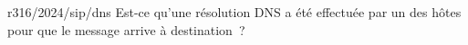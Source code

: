 \begin{question}{r316/2024/sip/dns}
  Est-ce qu'une résolution DNS a été effectuée par un des hôtes pour
  que le message arrive à destination~?
  \begin{reponses}
    \lastchoices
  \end{reponses}
\end{question}